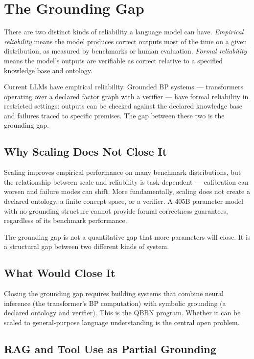 \section{The Grounding Gap}
\label{sec:grounding-gap}

There are two distinct kinds of reliability a language model can have.
\emph{Empirical reliability} means the model produces correct outputs most
of the time on a given distribution, as measured by benchmarks or human
evaluation. \emph{Formal reliability} means the model's outputs are
verifiable as correct relative to a specified knowledge base and ontology.

Current LLMs have empirical reliability. Grounded BP systems --- transformers
operating over a declared factor graph with a verifier --- have formal
reliability in restricted settings: outputs can be checked against the
declared knowledge base and failures traced to specific premises. The gap
between these two is the grounding gap.

\subsection*{Why Scaling Does Not Close It}

Scaling improves empirical performance on many benchmark distributions, but
the relationship between scale and reliability is task-dependent ---
calibration can worsen and failure modes can shift. More fundamentally,
scaling does not create a declared ontology, a finite concept space, or a
verifier. A 405B parameter model with no grounding structure cannot provide
formal correctness guarantees, regardless of its benchmark performance.

The grounding gap is not a quantitative gap that more parameters will close.
It is a structural gap between two different kinds of system.

\subsection*{What Would Close It}

Closing the grounding gap requires building systems that combine neural
inference (the transformer's BP computation) with symbolic grounding (a
declared ontology and verifier). This is the QBBN program. Whether it can
be scaled to general-purpose language understanding is the central open
problem.

\subsection*{RAG and Tool Use as Partial Grounding}

